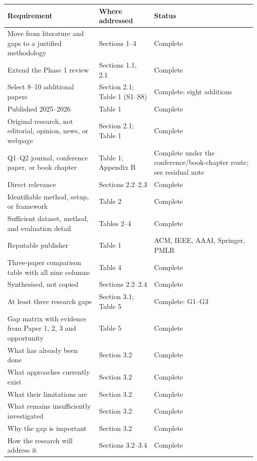 \documentclass[
]{article}
\begin{document}
\begin{longtable}[]{@{}
  >{\raggedright\arraybackslash}p{}
  >{\raggedright\arraybackslash}p{}
  >{\raggedright\arraybackslash}p{}@{}}
\toprule
Requirement & Where addressed & Status \\
\midrule
\endhead
Move from literature and gaps to a justified methodology & Sections 1--4
& Complete \\
Extend the Phase 1 review & Sections 1.1, 2.1 & Complete \\
Select 8--10 additional papers & Section 2.1; Table 1 (S1--S8) &
Complete: eight additions \\
Published 2025--2026 & Table 1 & Complete \\
Original research, not editorial, opinion, news, or webpage & Section
2.1; Table 1 & Complete \\
Q1--Q2 journal, conference paper, or book chapter & Table 1; Appendix B
& Complete under the conference/book-chapter route; see residual note \\
Direct relevance & Sections 2.2--2.3 & Complete \\
Identifiable method, setup, or framework & Table 2 & Complete \\
Sufficient dataset, method, and evaluation detail & Tables 2--4 &
Complete \\
Reputable publisher & Table 1 & ACM, IEEE, AAAI, Springer, PMLR \\
Three-paper comparison table with all nine columns & Table 4 &
Complete \\
Synthesised, not copied & Sections 2.2--2.4 & Complete \\
At least three research gaps & Section 3.1; Table 5 & Complete:
G1--G3 \\
Gap matrix with evidence from Paper 1, 2, 3 and opportunity & Table 5 &
Complete \\
What has already been done & Section 3.2 & Complete \\
What approaches currently exist & Section 3.2 & Complete \\
What their limitations are & Section 3.2 & Complete \\
What remains insufficiently investigated & Section 3.2 & Complete \\
Why the gap is important & Section 3.2 & Complete \\
How the research will address it & Sections 3.2--3.4 & Complete \\

\end{longtable}
\end{document}
